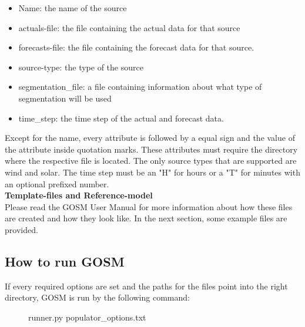 \begin{itemize}
	\item Name: the name of the source
	\item actuals-file: the file containing the actual data for that source
	\item forecasts-file: the file containing the forecast data for that source.
	\item source-type: the type of the source
	\item segmentation\_file: a file containing information about what type of segmentation will be used
	\item time\_step: the time step of the actual and forecast data.
\end{itemize}

Except for the name, every attribute is followed by a equal sign and the value of the attribute inside quotation marks. These attributes must require the directory where the respective file is located. The only source types that are supported are wind and solar. The time step must be an "H" for hours or a "T" for minutes with an optional prefixed number.\\

\textbf{Template-files and Reference-model}\\

Please read the GOSM User Manual for more information about how these files are created and how they look like. In the next section, some example files are provided.

\subsection{How to run GOSM}

If every required options are set and the paths for the files point into the right directory, GOSM is run by the following command:\\

\begin{figure}[H]
	\begin{framed}
		runner.py populator\_options.txt
	\end{framed}
\end{figure}
